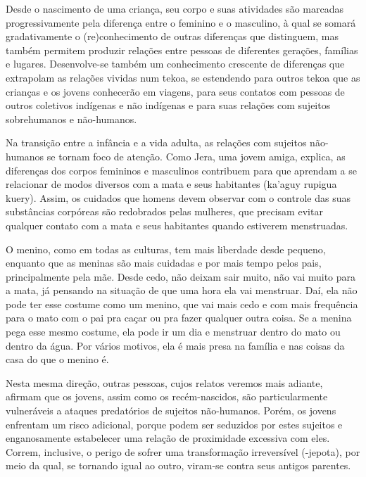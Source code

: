 \documentclass{article}
\begin{document}
Desde o nascimento de uma crian\c{c}a, seu corpo e suas atividades s\~ao
marcadas progressivamente pela diferen\c{c}a entre o feminino e o
masculino, \`a qual se somar\'a gradativamente o (re)conhecimento de
outras diferen\c{c}as que distinguem, mas tamb\'em permitem produzir
rela\c{c}\~oes entre pessoas de diferentes gera\c{c}\~oes, fam\'ilias e
lugares. Desenvolve-se tamb\'em um conhecimento crescente de
diferen\c{c}as que extrapolam as rela\c{c}\~oes vividas num tekoa, se
estendendo para outros tekoa que as crian\c{c}as e os jovens
conhecer\~ao em viagens, para seus contatos com pessoas de outros
coletivos ind\'igenas e n\~ao ind\'igenas e para suas rela\c{c}\~oes
com sujeitos sobrehumanos e n\~ao-humanos. 

Na transi\c{c}\~ao entre a inf\^ancia e a vida adulta, as rela\c{c}\~oes
com sujeitos n\~ao-humanos se tornam foco de aten\c{c}\~ao. Como Jera,
uma jovem amiga, explica, as diferen\c{c}as dos corpos femininos e
masculinos contribuem para que aprendam a se relacionar de modos
diversos com a mata e seus habitantes (ka{\textquoteright}aguy rupigua
kuery). Assim, os cuidados que homens devem observar com o controle das
suas subst\^ancias corp\'oreas s\~ao redobrados pelas mulheres, que
precisam evitar qualquer contato com a mata e seus habitantes quando
estiverem menstruadas. 

O menino, como em todas as culturas, tem mais liberdade desde pequeno,
enquanto que as meninas s\~ao mais cuidadas e por mais tempo pelos
pais, principalmente pela m\~ae. Desde cedo, n\~ao deixam sair muito,
n\~ao vai muito para a mata, j\'a pensando na situa\c{c}\~ao de que uma
hora ela vai menstruar. Da\'i, ela n\~ao pode ter esse costume como um
menino, que vai mais cedo e com mais frequ\^encia para o mato com o pai
pra ca\c{c}ar ou pra fazer qualquer outra coisa. Se a menina pega esse
mesmo costume, ela pode ir um dia e menstruar dentro do mato ou dentro
da \'agua. Por v\'arios motivos, ela \'e mais presa na fam\'ilia e nas
coisas da casa do que o menino \'e.

Nesta mesma dire\c{c}\~ao, outras pessoas, cujos relatos veremos mais
adiante, afirmam que os jovens, assim como os rec\'em-nascidos, s\~ao
particularmente vulner\'aveis a ataques predat\'orios de sujeitos
n\~ao-humanos. Por\'em, os jovens enfrentam um risco adicional, porque
podem ser seduzidos por estes sujeitos e enganosamente estabelecer uma
rela\c{c}\~ao de proximidade excessiva com eles. Correm, inclusive, o
perigo de sofrer uma transforma\c{c}\~ao irrevers\'ivel (-jepota), por
meio da qual, se tornando igual ao outro, viram-se contra seus antigos
parentes.
\end{document}
